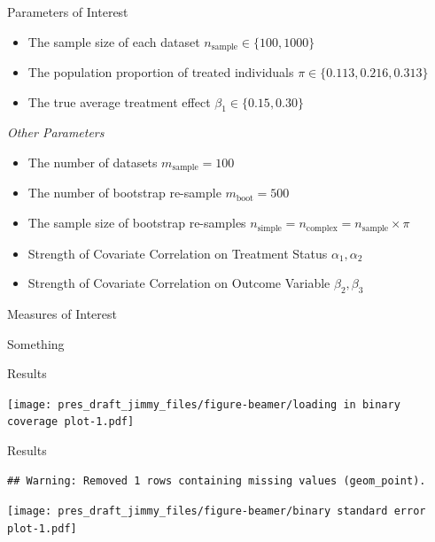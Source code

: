 \documentclass[
  ignorenonframetext,
]{beamer}
\providecommand{\tightlist}{%
  \setlength{\itemsep}{0pt}\setlength{\parskip}{0pt}}
\begin{document}
\begin{frame}{Parameters of Interest}
\protect\hypertarget{parameters-of-interest}{}

\begin{itemize}
\tightlist
\item
  The sample size of each dataset
  \(n_{\text{sample}} \in \{ 100, 1000 \}\)
\item
  The population proportion of treated individuals
  \(\pi \in \{ 0.113, 0.216, 0.313 \}\)
\item
  The true average treatment effect \(\beta_1 \in \{0.15, 0.30 \}\)
\end{itemize}

\emph{Other Parameters}

\begin{itemize}
\tightlist
\item
  The number of datasets \(m_{\text{sample}} = 100\)
\item
  The number of bootstrap re-sample \(m_{\text{boot}} = 500\)
\item
  The sample size of bootstrap re-samples
  \(n_{\text{simple}} = n_{\text{complex}} = n_{\text{sample}}\times \pi\)
\item
  Strength of Covariate Correlation on Treatment Status
  \(\alpha_1, \alpha_2\)
\item
  Strength of Covariate Correlation on Outcome Variable
  \(\beta_2, \beta_3\)
\end{itemize}

\end{frame}

\begin{frame}{Measures of Interest}
\protect\hypertarget{measures-of-interest}{}

Something

\end{frame}

\begin{frame}{Results}
\protect\hypertarget{results}{}

\texttt{[image: pres\_draft\_jimmy\_files/figure-beamer/loading in binary coverage plot-1.pdf]}

\end{frame}

\begin{frame}[fragile]{Results}
\protect\hypertarget{results-1}{}

\begin{verbatim}
## Warning: Removed 1 rows containing missing values (geom_point).
\end{verbatim}

\texttt{[image: pres\_draft\_jimmy\_files/figure-beamer/binary standard error plot-1.pdf]}

\end{frame}
\end{document}
